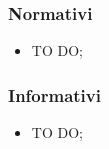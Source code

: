		\subsubsection{Normativi} %
		\label{ssub:normativi}
			\begin{itemize}
				\item TO DO;
			\end{itemize}

		\subsubsection{Informativi} %
		\label{ssub:informativi}
			\begin{itemize}
				\item TO DO;
			\end{itemize}
